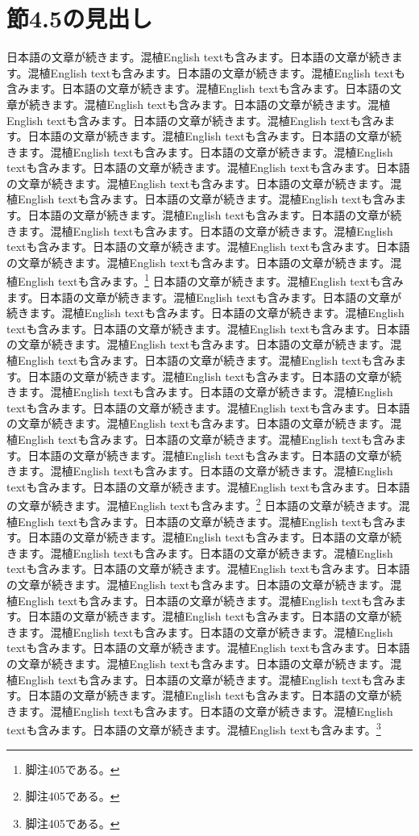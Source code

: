 \documentclass[pdflatex,book]{jlreq}
\begin{document}
\section{節4.5の見出し}
日本語の文章が続きます。混植English textも含みます。日本語の文章が続きます。混植English textも含みます。日本語の文章が続きます。混植English textも含みます。日本語の文章が続きます。混植English textも含みます。日本語の文章が続きます。混植English textも含みます。日本語の文章が続きます。混植English textも含みます。日本語の文章が続きます。混植English textも含みます。日本語の文章が続きます。混植English textも含みます。日本語の文章が続きます。混植English textも含みます。日本語の文章が続きます。混植English textも含みます。日本語の文章が続きます。混植English textも含みます。日本語の文章が続きます。混植English textも含みます。日本語の文章が続きます。混植English textも含みます。日本語の文章が続きます。混植English textも含みます。日本語の文章が続きます。混植English textも含みます。日本語の文章が続きます。混植English textも含みます。日本語の文章が続きます。混植English textも含みます。日本語の文章が続きます。混植English textも含みます。日本語の文章が続きます。混植English textも含みます。日本語の文章が続きます。混植English textも含みます。\footnote{脚注405である。}
日本語の文章が続きます。混植English textも含みます。日本語の文章が続きます。混植English textも含みます。日本語の文章が続きます。混植English textも含みます。日本語の文章が続きます。混植English textも含みます。日本語の文章が続きます。混植English textも含みます。日本語の文章が続きます。混植English textも含みます。日本語の文章が続きます。混植English textも含みます。日本語の文章が続きます。混植English textも含みます。日本語の文章が続きます。混植English textも含みます。日本語の文章が続きます。混植English textも含みます。日本語の文章が続きます。混植English textも含みます。日本語の文章が続きます。混植English textも含みます。日本語の文章が続きます。混植English textも含みます。日本語の文章が続きます。混植English textも含みます。日本語の文章が続きます。混植English textも含みます。日本語の文章が続きます。混植English textも含みます。日本語の文章が続きます。混植English textも含みます。日本語の文章が続きます。混植English textも含みます。日本語の文章が続きます。混植English textも含みます。日本語の文章が続きます。混植English textも含みます。\footnote{脚注405である。}
日本語の文章が続きます。混植English textも含みます。日本語の文章が続きます。混植English textも含みます。日本語の文章が続きます。混植English textも含みます。日本語の文章が続きます。混植English textも含みます。日本語の文章が続きます。混植English textも含みます。日本語の文章が続きます。混植English textも含みます。日本語の文章が続きます。混植English textも含みます。日本語の文章が続きます。混植English textも含みます。日本語の文章が続きます。混植English textも含みます。日本語の文章が続きます。混植English textも含みます。日本語の文章が続きます。混植English textも含みます。日本語の文章が続きます。混植English textも含みます。日本語の文章が続きます。混植English textも含みます。日本語の文章が続きます。混植English textも含みます。日本語の文章が続きます。混植English textも含みます。日本語の文章が続きます。混植English textも含みます。日本語の文章が続きます。混植English textも含みます。日本語の文章が続きます。混植English textも含みます。日本語の文章が続きます。混植English textも含みます。日本語の文章が続きます。混植English textも含みます。\footnote{脚注405である。}
\end{document}
